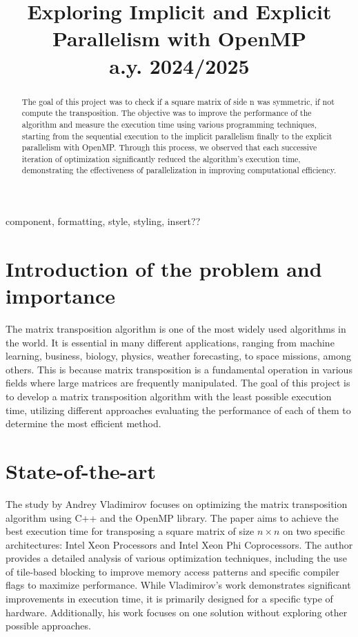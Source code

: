 \documentclass[conference]{IEEEtran}
\begin{document}
\title{Exploring Implicit and Explicit Parallelism with
OpenMP\\
{\footnotesize a.y. 2024/2025}
}

\author{
}

\maketitle

\begin{abstract}
The goal of this project was to check if a square matrix of side n was symmetric, if not compute the transposition. The objective was to improve the performance of the algorithm and measure the execution time using various programming techniques, starting from the sequential execution to the implicit parallelism finally to the explicit parallelism with OpenMP. Through this process, we observed that each successive iteration of optimization significantly reduced the algorithm's execution time, demonstrating the effectiveness of parallelization in improving computational efficiency.
\end{abstract}

\begin{IEEEkeywords}
component, formatting, style, styling, insert??
\end{IEEEkeywords}

\section{Introduction of the problem and importance}
The matrix transposition algorithm is one of the most widely used algorithms in the world. It is essential in many different applications, ranging from machine learning, business, biology, physics,  weather forecasting, to space missions, among others. This is because matrix transposition is a fundamental operation in various fields where large matrices are frequently manipulated.
The goal of this project is to develop a matrix transposition algorithm with the least possible execution time, utilizing different approaches evaluating the performance of each of them to determine the most efficient method.

\section{State-of-the-art}
The study by Andrey Vladimirov focuses on optimizing the matrix transposition algorithm using C++ and the OpenMP library. The paper aims to achieve the best execution time for transposing a square matrix of size $n\times n$ on two specific architectures: Intel Xeon Processors and Intel Xeon Phi Coprocessors. The author provides a detailed analysis of various optimization techniques, including the use of tile-based blocking to improve memory access patterns and specific compiler flags to maximize performance.
While Vladimirov’s work demonstrates significant improvements in execution time, it is primarily designed for a specific type of hardware. Additionally, his work focuses on one solution without exploring other possible approaches.
\end{document}
